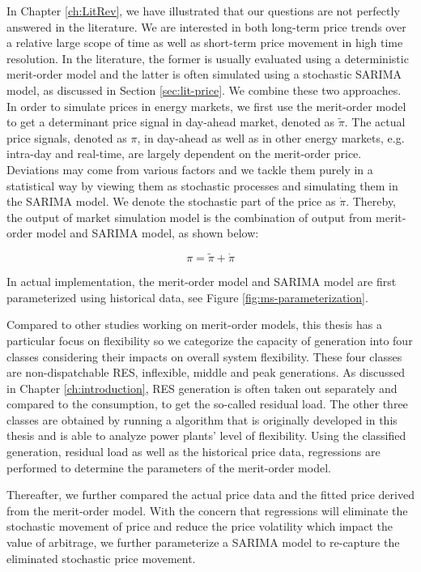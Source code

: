 In Chapter \ref{ch:LitRev}, we have illustrated that our questions are not perfectly answered in the literature. We are interested in both long-term price trends over a relative large scope of time as well as short-term price movement in high time resolution. In the literature, the former is usually evaluated using a deterministic merit-order model and the latter is often simulated using a stochastic SARIMA model, as discussed in Section \ref{sec:lit-price}. We combine these two approaches. In order to simulate prices in energy markets, we first use the merit-order model to get a determinant price signal in day-ahead market, denoted as $\tilde{\pi}$. The actual price signals, denoted as $\pi$, in day-ahead as well as in other energy markets, e.g. intra-day and real-time, are largely dependent on the merit-order price. Deviations may come from various factors and we tackle them purely in a statistical way by viewing them as stochastic processes and simulating them in the SARIMA model. We denote the stochastic part of the price as $\dot{\pi}$. Thereby, the output of market simulation model is the combination of output from merit-order model and SARIMA model, as shown below:

\begin{equation}
\pi = \tilde{\pi} + \dot{\pi}
\end{equation}

In actual implementation, the merit-order model and SARIMA model are first parameterized using historical data, see Figure \ref{fig:ms-parameterization}. 

Compared to other studies working on merit-order models, this thesis has a particular focus on flexibility so we categorize the capacity of generation into four classes considering their impacts on overall system flexibility. These four classes are non-dispatchable RES, inflexible, middle and peak generations. As discussed in Chapter \ref{ch:introduction}, RES generation is often taken out separately and compared to the consumption, to get the so-called residual load. The other three classes are obtained by running a algorithm that is originally developed in this thesis and is able to analyze power plants' level of flexibility. Using the classified generation, residual load as well as the historical price data, regressions are performed to determine the parameters of the merit-order model. 

Thereafter, we further compared the actual price data and the fitted price derived from the merit-order model. With the concern that regressions will eliminate the stochastic movement of price and reduce the price volatility which impact the value of arbitrage, we further parameterize a SARIMA model to re-capture the eliminated stochastic price movement. 

